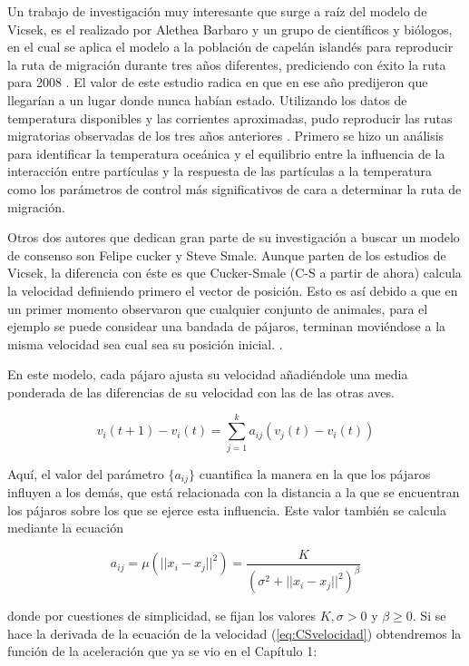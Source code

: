  Un trabajo de investigación muy interesante que surge a raíz del modelo de Vicsek, es el realizado por Alethea Barbaro y un grupo de científicos y biólogos, en el cual se aplica el modelo a la población de capelán islandés para reproducir la ruta de migración durante tres años diferentes, prediciendo con éxito la ruta para 2008 \cite{barbaroModellingSimulations}. El valor de este estudio radica en que en ese año predijeron que llegarían a un lugar donde nunca habían estado. Utilizando los datos de temperatura disponibles y las corrientes aproximadas, pudo reproducir las rutas migratorias observadas de los tres años anteriores \cite{barbaro2009simulations}. Primero se hizo un análisis para identificar la temperatura oceánica y el equilibrio entre la influencia de la interacción entre partículas y la respuesta de las partículas a la temperatura como los parámetros de control más significativos de cara a determinar la ruta de migración.
 
 Otros dos autores que dedican gran parte de su investigación a buscar un modelo de consenso son Felipe cucker y Steve Smale.  Aunque parten de los estudios de Vicsek, la diferencia con éste es que Cucker-Smale (C-S a partir de ahora) calcula la velocidad definiendo primero el vector de posición. Esto es así debido a que en un primer momento observaron que cualquier conjunto de animales, para el ejemplo se puede considear una bandada de pájaros, terminan moviéndose a la misma velocidad sea cual sea su posición inicial. \cite{cucker2007emergent}.
 
 En este modelo, cada pájaro ajusta su velocidad añadiéndole una media ponderada de las diferencias de su velocidad con las de las otras aves. 
 
 \begin{equation}\label{eq:CSvelocidad}
     v_{i}(t+1)-v_{i}(t)=\sum_{j=1}^k a_{ij}(v_{j}(t)-v_{i}(t))
 \end{equation}
 
 Aquí, el valor del parámetro $\{a_{ij}\}$ cuantifica la manera en la que los pájaros influyen a los demás, que está relacionada con la distancia a la que se encuentran los pájaros sobre los que se ejerce esta influencia. Este valor también se calcula mediante la ecuación 
 
 \begin{equation}
     \label{eq:CSaij}
     a_{ij} = \mu(||x_{i}-x_{j}||^2) = \frac{K}{(\sigma^2 + ||x_i-x_j||^2)^\beta}
 \end{equation}
 
 donde por cuestiones de simplicidad, se fijan los valores $K,\sigma>0$ y $\beta \ge 0$. Si se hace la derivada de la ecuación de la velocidad (\ref{eq:CSvelocidad}) obtendremos la función de la aceleración que ya se vio en el Capítulo 1:
 
